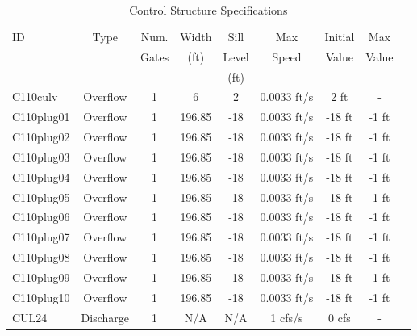 \scriptsize
\begin{table}[h]
\caption{Control Structure Specifications}
\label{tab:struc-specs1}
\begin{tabular}{@{}lcccccccc@{}}
\toprule
{ID}            & {Type}        & Num.     & Width       & Sill         & Max         & Initial         & Max       \\
                &               & Gates    & (ft)        & Level        & Speed       & Value           & Value     \\
                &               &          &             & (ft)         &             &                 &           \\
\hline
{C110culv}      & Overflow      & 1        & 6           & 2            & 0.0033 ft/s     & 2 ft            & -            \\
{C110plug01}    & Overflow      & 1        & 196.85      & -18          & 0.0033 ft/s     & -18 ft          & -1 ft           \\
{C110plug02}    & Overflow      & 1        & 196.85      & -18          & 0.0033 ft/s     & -18 ft          & -1 ft           \\
{C110plug03}    & Overflow      & 1        & 196.85      & -18          & 0.0033 ft/s     & -18 ft          & -1 ft           \\
{C110plug04}    & Overflow      & 1        & 196.85      & -18          & 0.0033 ft/s     & -18 ft          & -1 ft           \\
{C110plug05}    & Overflow      & 1        & 196.85      & -18          & 0.0033 ft/s     & -18 ft          & -1 ft           \\
{C110plug06}    & Overflow      & 1        & 196.85      & -18          & 0.0033 ft/s     & -18 ft          & -1 ft           \\
{C110plug07}    & Overflow      & 1        & 196.85      & -18          & 0.0033 ft/s     & -18 ft          & -1 ft           \\
{C110plug08}    & Overflow      & 1        & 196.85      & -18          & 0.0033 ft/s     & -18 ft          & -1 ft           \\
{C110plug09}    & Overflow      & 1        & 196.85      & -18          & 0.0033 ft/s     & -18 ft          & -1 ft           \\
{C110plug10}    & Overflow      & 1        & 196.85      & -18          & 0.0033 ft/s     & -18 ft          & -1 ft           \\
{CUL24}         & Discharge     & 1        & N/A         & N/A          & 1 cfs/s         & 0 cfs           & -            \\

\end{tabular}
\end{table}
